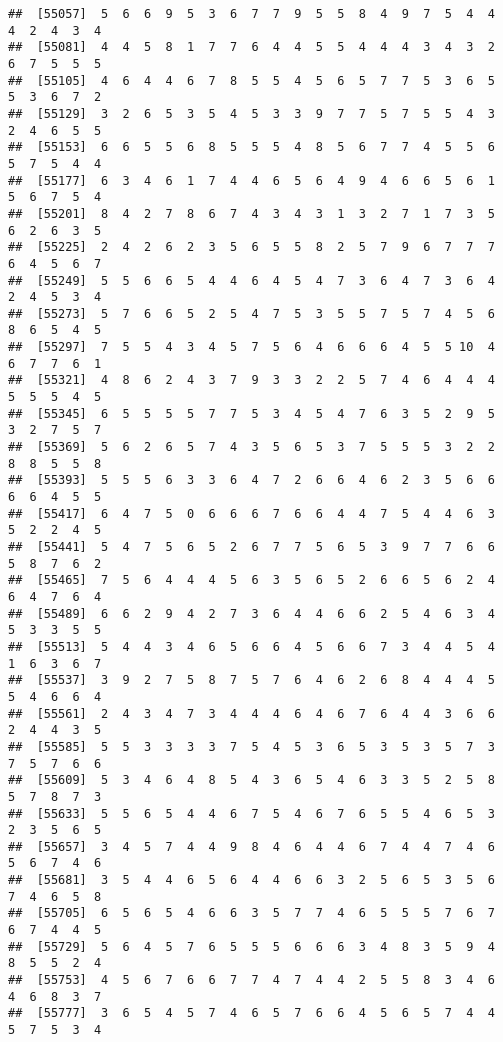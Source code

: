 \documentclass[
]{book}
\begin{document}
\begin{verbatim}
##  [55057]  5  6  6  9  5  3  6  7  7  9  5  5  8  4  9  7  5  4  4  4  2  4  3  4
##  [55081]  4  4  5  8  1  7  7  6  4  4  5  5  4  4  4  3  4  3  2  6  7  5  5  5
##  [55105]  4  6  4  4  6  7  8  5  5  4  5  6  5  7  7  5  3  6  5  5  3  6  7  2
##  [55129]  3  2  6  5  3  5  4  5  3  3  9  7  7  5  7  5  5  4  3  2  4  6  5  5
##  [55153]  6  6  5  5  6  8  5  5  5  4  8  5  6  7  7  4  5  5  6  5  7  5  4  4
##  [55177]  6  3  4  6  1  7  4  4  6  5  6  4  9  4  6  6  5  6  1  5  6  7  5  4
##  [55201]  8  4  2  7  8  6  7  4  3  4  3  1  3  2  7  1  7  3  5  6  2  6  3  5
##  [55225]  2  4  2  6  2  3  5  6  5  5  8  2  5  7  9  6  7  7  7  6  4  5  6  7
##  [55249]  5  5  6  6  5  4  4  6  4  5  4  7  3  6  4  7  3  6  4  2  4  5  3  4
##  [55273]  5  7  6  6  5  2  5  4  7  5  3  5  5  7  5  7  4  5  6  8  6  5  4  5
##  [55297]  7  5  5  4  3  4  5  7  5  6  4  6  6  6  4  5  5 10  4  6  7  7  6  1
##  [55321]  4  8  6  2  4  3  7  9  3  3  2  2  5  7  4  6  4  4  4  5  5  5  4  5
##  [55345]  6  5  5  5  5  7  7  5  3  4  5  4  7  6  3  5  2  9  5  3  2  7  5  7
##  [55369]  5  6  2  6  5  7  4  3  5  6  5  3  7  5  5  5  3  2  2  8  8  5  5  8
##  [55393]  5  5  5  6  3  3  6  4  7  2  6  6  4  6  2  3  5  6  6  6  6  4  5  5
##  [55417]  6  4  7  5  0  6  6  6  7  6  6  4  4  7  5  4  4  6  3  5  2  2  4  5
##  [55441]  5  4  7  5  6  5  2  6  7  7  5  6  5  3  9  7  7  6  6  5  8  7  6  2
##  [55465]  7  5  6  4  4  4  5  6  3  5  6  5  2  6  6  5  6  2  4  6  4  7  6  4
##  [55489]  6  6  2  9  4  2  7  3  6  4  4  6  6  2  5  4  6  3  4  5  3  3  5  5
##  [55513]  5  4  4  3  4  6  5  6  6  4  5  6  6  7  3  4  4  5  4  1  6  3  6  7
##  [55537]  3  9  2  7  5  8  7  5  7  6  4  6  2  6  8  4  4  4  5  5  4  6  6  4
##  [55561]  2  4  3  4  7  3  4  4  4  6  4  6  7  6  4  4  3  6  6  2  4  4  3  5
##  [55585]  5  5  3  3  3  3  7  5  4  5  3  6  5  3  5  3  5  7  3  7  5  7  6  6
##  [55609]  5  3  4  6  4  8  5  4  3  6  5  4  6  3  3  5  2  5  8  5  7  8  7  3
##  [55633]  5  5  6  5  4  4  6  7  5  4  6  7  6  5  5  4  6  5  3  2  3  5  6  5
##  [55657]  3  4  5  7  4  4  9  8  4  6  4  4  6  7  4  4  7  4  6  5  6  7  4  6
##  [55681]  3  5  4  4  6  5  6  4  4  6  6  3  2  5  6  5  3  5  6  7  4  6  5  8
##  [55705]  6  5  6  5  4  6  6  3  5  7  7  4  6  5  5  5  7  6  7  6  7  4  4  5
##  [55729]  5  6  4  5  7  6  5  5  5  6  6  6  3  4  8  3  5  9  4  8  5  5  2  4
##  [55753]  4  5  6  7  6  6  7  7  4  7  4  4  2  5  5  8  3  4  6  4  6  8  3  7
##  [55777]  3  6  5  4  5  7  4  6  5  7  6  6  4  5  6  5  7  4  4  5  7  5  3  4

\end{verbatim}
\end{document}
